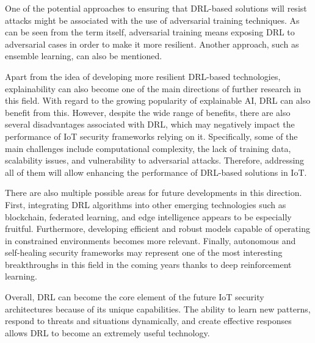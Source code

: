 \documentclass[12pt]{article}
\begin{document}
One of the potential approaches to ensuring that DRL-based solutions will resist attacks might be associated with the use of adversarial training techniques. As can be seen from the term itself, adversarial training means exposing DRL to adversarial cases in order to make it more resilient. Another approach, such as ensemble learning, can also be mentioned.

Apart from the idea of developing more resilient DRL-based technologies, explainability can also become one of the main directions of further research in this field. With regard to the growing popularity of explainable AI, DRL can also benefit from this.
However, despite the wide range of benefits, there are also several disadvantages associated with DRL, which may negatively impact the performance of IoT security frameworks relying on it. Specifically, some of the main challenges include computational complexity, the lack of training data, scalability issues, and vulnerability to adversarial attacks. Therefore, addressing all of them will allow enhancing the performance of DRL-based solutions in IoT.

There are also multiple possible areas for future developments in this direction. First, integrating DRL algorithms into other emerging technologies such as blockchain, federated learning, and edge intelligence appears to be especially fruitful. Furthermore, developing efficient and robust models capable of operating in constrained environments becomes more relevant. Finally, autonomous and self-healing security frameworks may represent one of the most interesting breakthroughs in this field in the coming years thanks to deep reinforcement learning.

Overall, DRL can become the core element of the future IoT security architectures because of its unique capabilities. The ability to learn new patterns, respond to threats and situations dynamically, and create effective responses allows DRL to become an extremely useful technology.
	

	
	
	
\end{document}
